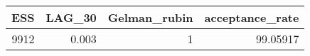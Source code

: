 \begin{longtable}{rrrr}
\toprule
ESS & LAG\_30 & Gelman\_rubin & acceptance\_rate \\ 
\midrule
9912 & 0.003 & 1 & 99.05917 \\ 
\bottomrule
\end{longtable}

